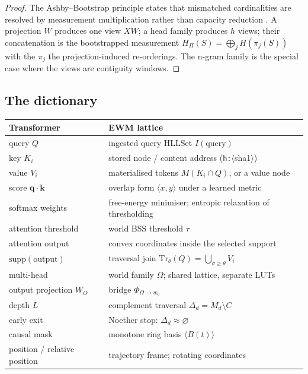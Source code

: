 \documentclass[11pt,a4paper]{article}
\theoremstyle{remark}
\newcommand{\spanof}[1]{\ensuremath{\langle #1\rangle}}%
\newcommand{\supp}{\ensuremath{\mathrm{supp}}}         %
\newcommand{\Trv}{\ensuremath{\mathrm{Tr}}}             %
\newcommand{\World}{\ensuremath{w}}                     %
\newcommand{\Bnd}{\ensuremath{\Phi}}                    %
\newcommand{\q}{\ensuremath{\mathbf{q}}}                %
\renewcommand{\k}{\ensuremath{\mathbf{k}}}              %
\newcommand{\sigm}{\ensuremath{\sigma}}                 %
\begin{document}
\begin{proof}
The Ashby--Bootstrap principle states that mismatched cardinalities are resolved
by measurement multiplication rather than capacity reduction
\cite{ewm2026,ashby1952}. A projection $W$ produces one view $XW$; a head
family produces $h$ views; their concatenation is the bootstrapped measurement
$H_\Pi(S)=\bigoplus_j H(\pi_j(S))$ with the $\pi_j$ the projection-induced
re-orderings. The n-gram family is the special case where the views are
contiguity windows.
\end{proof}

\clearpage
\subsection{The dictionary}

\begin{table}[!ht]
\centering
\small
\renewcommand{\arraystretch}{1.15}
\begin{tabular}{@{}p{}p{}@{}}
\toprule
\textbf{Transformer} & \textbf{EWM lattice} \\
\midrule
query $Q$ & ingested query HLLSet $I(\text{query})$ \\
key $K_i$ & stored node / content address (\texttt{h:}$\langle$sha1$\rangle$) \\
value $V_i$ & materialised tokens $M(K_i\cap Q)$, or a value node \\
score $\q\!\cdot\!\k$ & overlap form $\langle x,y\rangle$ under a learned metric \\
softmax weights & free-energy minimiser; entropic relaxation of thresholding \\
attention threshold & world BSS threshold $\tau$ \\
attention output & convex coordinates inside the selected support \\
$\supp(\text{output})$ & traversal join $\Trv_\theta(Q)=\bigcup_{\sigm\ge\theta}V_i$ \\
multi-head & world family $\Omega$; shared lattice, separate LUTs \\
output projection $W_O$ & bridge $\Bnd_{\Omega\to\World_0}$ \\
depth $L$ & complement traversal $\Delta_d=M_d\setminus C$ \\
early exit & Noether stop: $\Delta_d\approx\varnothing$ \\
causal mask & monotone ring basis $\spanof{B(t)}$ \\
position / relative position & trajectory frame; rotating coordinates \\

\end{tabular}
\end{table}
\end{document}
